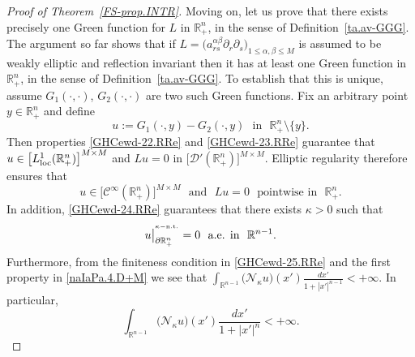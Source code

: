 \documentclass[11pt,reqno]{amsart}
\numberwithin{equation}{section}
\theoremstyle{remark}
\begin{document}
\begin{proof}[Proof of Theorem~\ref{FS-prop.INTR}]
Moving on, let us prove that there exists precisely one Green function for $L$ in ${\mathbb{R}}^n_{+}$, 
in the sense of Definition~\ref{ta.av-GGG}. The argument so far shows that if 
$L=\Big(a^{\alpha\beta}_{rs}\partial_r\partial_s\Big)_{1\leq\alpha,\beta\leq M}$ is assumed to be weakly elliptic and reflection invariant then it has at least one Green function in ${\mathbb{R}}^n_{+}$, in the sense of Definition~\ref{ta.av-GGG}. 
To establish that this is unique, assume $G_1(\cdot,\cdot)$, $G_2(\cdot,\cdot)$ are two such Green functions. Fix an arbitrary 
point $y\in{\mathbb{R}}^n_{+}$ and define 
%
\begin{equation}\label{eq:UUU}
u:=G_1(\cdot,y)-G_2(\cdot,y)\,\,\text{ in }\,\,{\mathbb{R}}^n_{+}\setminus\{y\}. 
\end{equation}
%
Then properties \eqref{GHCewd-22.RRe} and \eqref{GHCewd-23.RRe} guarantee that 
$u\in\big[L^1_{\rm loc}({\mathbb{R}}^n_{+})\big]^{M\times M}$ and $Lu=0$ in 
$\big[{\mathcal{D}}'({\mathbb{R}}^n_{+})\big]^{M\times M}$. Elliptic regularity therefore ensures that 
%
\begin{equation}\label{naIaPa.4.D+M}
u\in\big[{\mathscr{C}}^\infty({\mathbb{R}}^n_{+})\big]^{M\times M}
\,\,\text{ and }\,\,Lu=0\,\,\text{ pointwise in }\,\,{\mathbb{R}}^n_{+}.
\end{equation}
%
In addition, \eqref{GHCewd-24.RRe} guarantees that there exists $\kappa>0$ such that 
%
\begin{equation}\label{naIaPa.5.D+M}
u\big|^{{}^{\kappa-{\rm n.t.}}}_{\partial{\mathbb{R}}^n_{+}}=0\,\,\text{ a.e. in }\,\,{\mathbb{R}}^{n-1}.
\end{equation}
%
Furthermore, from the finiteness condition in \eqref{GHCewd-25.RRe} and the first property in \eqref{naIaPa.4.D+M} we see that 
$\int_{{\mathbb{R}}^{n-1}}\big({\mathcal{N}}_{\kappa}u\big)(x')\frac{dx'}{1+|x'|^{n-1}}<+\infty$. In particular,
%
\begin{equation}\label{GHReRFv.BNv.D+M}
\int_{{\mathbb{R}}^{n-1}}\big({\mathcal{N}}_{\kappa}u\big)(x')\frac{dx'}{1+|x'|^{n}}<+\infty.
\end{equation}


\end{proof}
\end{document}
